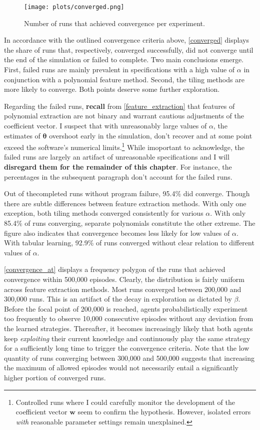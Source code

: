 \begin{figure}
	\texttt{[image: plots/converged.png]}
	\caption{Number of runs that achieved convergence per experiment.}
	\label{converged}
\end{figure}

In accordance with the outlined convergence criteria above, \autoref{converged} displays the share of runs that, respectively, converged successfully, did not converge until the end of the simulation or failed to complete. Two main conclusions emerge. First, failed runs are mainly prevalent in specifications with a high value of $\alpha$ in conjunction with a polynomial feature method. Second, the tiling methods are more likely to converge. Both points deserve some further exploration.

Regarding the failed runs, \textbf{recall} from \autoref{feature_extraction} that features of polynomial extraction are not binary and warrant cautious adjustments of the coefficient vector. I suspect that with unreasonably large values of $\alpha$, the estimates of $\boldsymbol{\theta}$ overshoot early in the simulation, don't recover and at some point exceed the software's numerical limits.\footnote{Controlled runs where I could carefully monitor the development of the coefficient vector $\boldsymbol{w}$ seem to confirm the hypothesis. However, isolated errors \emph{with} reasonable parameter settings remain unexplained.} While imoportant to acknowledge, the failed runs are largely an artifact of unreasonable specifications and I will \textbf{disregard them for the remainder of this chapter}. For instance, the percentages in the subsequent paragraph don't account for the failed runs.

Out of thecompleted runs without program failure, 95.4\% did converge. Though there are subtle differences between feature extraction methods. With only one exception, both tiling methods converged consistently for various $\alpha$. With only 85.4\% of runs converging, separate polynomials constitute the other extreme. The figure also indicates that convergence becomes less likely for low values of $\alpha$. With tabular learning, 92.9\% of runs converged without clear relation to different values of $\alpha$.

\autoref{convergence_at} displays a frequency polygon of the runs that achieved convergence within 500,000 episodes. Clearly, the distribution is fairly uniform across feature extraction methods. Most runs converged between 200,000 and 300,000 runs. This is an artifact of the decay in exploration as dictated by $\beta$. Before the focal point of 200,000 is reached, agents probabilistically experiment too frequently to observe 10,000 consecutive episodes without any deviation from the learned strategies. Thereafter, it becomes increasingly likely that both agents keep \emph{exploiting} their current knowledge and continuously play the same strategy for a sufficiently long time to trigger the convergence criteria. Note that the low quantity of runs converging between 300,000 and 500,000 suggests that increasing the maximum of allowed episodes would not necessarily entail a significantly higher portion of converged runs.

